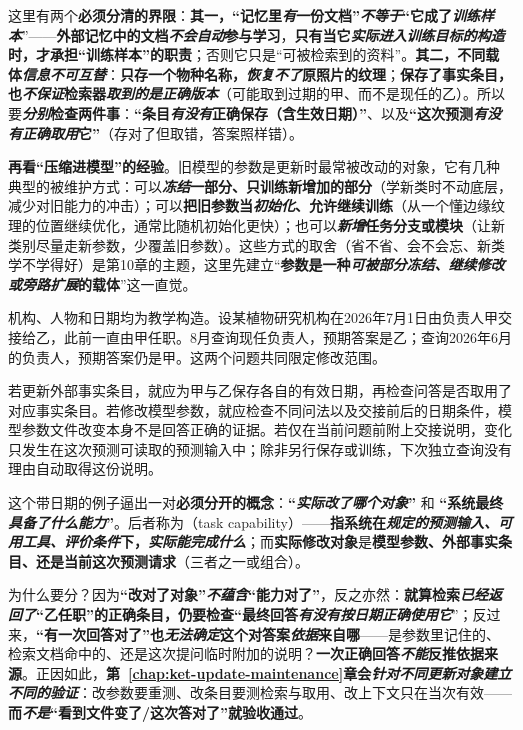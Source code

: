 这里有两个\textbf{必须分清的界限}：\textbf{其一，“记忆里\emph{有}一份文档”\emph{不等于}“它成了\emph{训练样本}}”——\textbf{外部记忆中的文档\emph{不会自动}参与学习}，\textbf{只有当它\emph{实际进入训练目标的构造}时，才承担“训练样本”的职责}；否则它只是“可被检索到的资料”。\textbf{其二，不同载体\emph{信息不可互替}}：\textbf{只存一个物种名称，\emph{恢复不了}原照片的纹理}；\textbf{保存了事实条目，也\emph{不保证}检索器\emph{取到的是正确版本}}（可能取到过期的甲、而不是现任的乙）。所以要\textbf{\emph{分别}检查两件事}：\textbf{“条目\emph{有没有}正确保存（含生效日期）”}、以及\textbf{“这次预测\emph{有没有正确取用}它”}（存对了但取错，答案照样错）。

\textbf{再看“压缩进模型”的经验}。旧模型的参数是更新时最常被改动的对象，它有几种典型的被维护方式：可以\textbf{\emph{冻结}一部分、只训练新增加的部分}（学新类时不动底层，减少对旧能力的冲击）；可以\textbf{把旧参数当\emph{初始化}、允许继续训练}（从一个懂边缘纹理的位置继续优化，通常比随机初始化更快）；也可以\textbf{\emph{新增}任务分支或模块}（让新类别尽量走新参数，少覆盖旧参数）。这些方式的取舍（省不省、会不会忘、新类学不学得好）是第10章的主题，这里先建立“\textbf{参数是一种\emph{可被部分冻结、继续修改或旁路扩展}的载体}”这一直觉。

\begin{example}[带生效日期的事实修正]
\label{ex:ket-overview-dated-fact}
机构、人物和日期均为教学构造。设某植物研究机构在2026年7月1日由负责人甲交接给乙，此前一直由甲任职。8月查询现任负责人，预期答案是乙；查询2026年6月的负责人，预期答案仍是甲。这两个问题共同限定修改范围。

若更新外部事实条目，就应为甲与乙保存各自的有效日期，再检查问答是否取用了对应事实条目。若修改模型参数，就应检查不同问法以及交接前后的日期条件，模型参数文件改变本身不是回答正确的证据。若仅在当前问题前附上交接说明，变化只发生在这次预测可读取的预测输入中；除非另行保存或训练，下次独立查询没有理由自动取得这份说明。
\end{example}

这个带日期的例子逼出一对\textbf{必须分开的概念}：\textbf{“\emph{实际改了哪个对象}”} 和 \textbf{“系统最终\emph{具备了什么能力}”}。后者称为（task capability）——\textbf{指系统在\emph{规定的预测输入、可用工具、评价条件}下，\emph{实际能完成什么}}；而\textbf{实际修改对象}是\textbf{模型参数、外部事实条目、还是当前这次预测请求}（三者之一或组合）。

为什么要分？因为\textbf{“改对了对象”\emph{不蕴含}“能力对了”}，反之亦然：\textbf{就算检索\emph{已经返回了}“乙任职”的正确条目，仍要检查“最终回答\emph{有没有按日期\emph{正确使用}它}}”；反过来，\textbf{“有一次回答对了”也\emph{无法确定}这个对答案\emph{依据}来自哪}——是参数里记住的、检索文档命中的、还是这次提问临时附加的说明？\textbf{一次正确回答\emph{不能}反推依据来源}。正因如此，\textbf{第~\ref{chap:ket-update-maintenance}章会\emph{针对不同更新对象建立不同的验证}}：改参数要重测、改条目要测检索与取用、改上下文只在当次有效——\textbf{而\emph{不是}“看到文件变了/这次答对了”就验收通过}。

